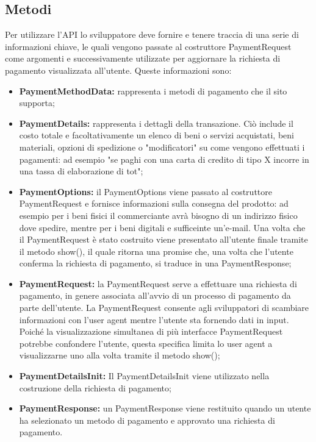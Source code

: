 \documentclass[11pt ,a4paper , twoside , openright ]{book}
\begin{document}
	\subsection[Metodi]{Metodi \cite{rif1}}
	Per utilizzare l'API lo sviluppatore deve fornire e tenere traccia di una serie di informazioni chiave, le quali vengono passate al costruttore PaymentRequest come argomenti e successivamente utilizzate per aggiornare la richiesta di pagamento visualizzata all'utente. Queste informazioni sono:
	\begin{itemize}
		\item \textbf{PaymentMethodData:} rappresenta i metodi di pagamento che il sito supporta;
		\item \textbf{PaymentDetails:} rappresenta i dettagli della transazione. Ciò include il costo totale e facoltativamente un elenco di beni o servizi acquistati, beni materiali, opzioni di spedizione o "modificatori" su come vengono effettuati i pagamenti: ad esempio "se paghi con una carta di credito di tipo X incorre in una tassa di elaborazione di tot";
		\item \textbf{PaymentOptions:} il PaymentOptions viene passato al costruttore PaymentRequest e fornisce informazioni sulla consegna del prodotto: ad esempio per i beni fisici il commerciante avrà bisogno di un indirizzo fisico dove spedire, mentre per i beni digitali e sufficeinte un'e-mail. Una volta che il PaymentRequest è stato costruito viene presentato all'utente finale tramite il metodo show(), il quale ritorna una promise che, una volta che l'utente conferma la richiesta di pagamento, si traduce in una PaymentResponse;
		\item \textbf{PaymentRequest:} la PaymentRequest serve a effettuare una richiesta di pagamento, in genere associata all'avvio di un processo di pagamento da parte dell'utente. La PaymentRequest consente agli sviluppatori di scambiare informazioni con l'user agent mentre l'utente sta fornendo dati in input. Poiché la visualizzazione simultanea di più interfacce PaymentRequest potrebbe confondere l'utente, questa specifica limita lo user agent a visualizzarne uno alla volta tramite il metodo show();
		\item \textbf{PaymentDetailsInit:} Il PaymentDetailsInit viene utilizzato nella costruzione della richiesta di pagamento;
		\item \textbf{PaymentResponse:} un PaymentResponse viene restituito quando un utente ha selezionato un metodo di pagamento e approvato una richiesta di pagamento.
	\end{itemize}
	
\end{document}
